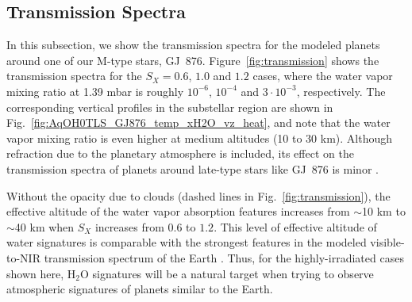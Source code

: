 \documentclass[11pt,numberedappendix,twocolappendix,]{emulateapj}
\def\water{H$_2$O}
\def\preslevel{1.39 mbar}
\def\wv{water vapor}
\begin{document}
\subsection{Transmission Spectra}
\label{ss:result_TransmissionSpectra}

In this subsection, we show the transmission spectra for the modeled planets around one of our M-type stars, GJ~876. 
Figure~\ref{fig:transmission} shows the transmission spectra for the $S_X=0.6$, $1.0$ and $1.2$ cases, where the \wv{} mixing ratio at \preslevel{} is roughly $10^{-6}$, $10^{-4}$ and $3\cdot 10^{-3}$, respectively. 
The corresponding vertical profiles in the substellar region are shown in Fig.~\ref{fig:AqOH0TLS_GJ876_temp_xH2O_vz_heat}, and note that the \wv{} mixing ratio is even higher at medium altitudes (10 to 30 km).
Although refraction due to the planetary atmosphere is included, its effect on the transmission spectra of planets around late-type stars like GJ~876 is minor \citep{Betremieux2014,Misra2014}. 


Without the opacity due to clouds (dashed lines in Fig.~\ref{fig:transmission}), the effective altitude of the water vapor absorption features increases from $\sim $10 km to $\sim $40 km when $S_X$ increases from $0.6$ to $1.2$. 
This level of effective altitude of water signatures is comparable with the strongest features in the modeled visible-to-NIR transmission spectrum of the Earth \citep[e.g.,][]{Kaltenegger2009}.
Thus, for the highly-irradiated cases shown here, \water{} signatures will be a natural target when trying to observe atmospheric signatures of planets similar to the Earth. 
\end{document}
